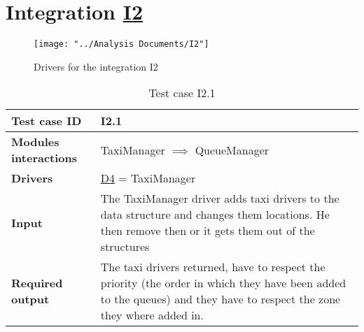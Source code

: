 \section{Integration \hyperref[I2]{I2} \label{int_I2}}
\begin{figure}[H]
\centering
\texttt{[image: "../Analysis Documents/I2"]}
\caption{Drivers for the integration I2}
\end{figure}

\begin{table}[H]
	\begin{tabular}{ l | p{} }
		\textbf{Test case ID} & I2.1 \\ \hline
		\textbf{Modules interactions} & TaxiManager $\implies$ QueueManager \\ \hline
		\textbf{Drivers} &  \hyperref[D4]{D4} = TaxiManager \\ \hline
		\textbf{Input} &  The TaxiManager driver adds taxi drivers to the data structure and changes them locations. He then remove then or it gets them out of the structures \\ \hline
		\textbf{Required output} & The taxi drivers returned, have to respect the priority (the order in which they have been added to the queues) and they have to respect the zone they where added in.
	\end{tabular}
	\caption{Test case I2.1}
\end{table}